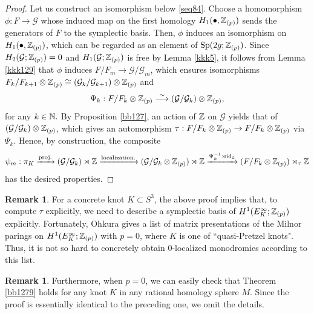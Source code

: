 \documentclass{article}
\theoremstyle{plain}
\theoremstyle{definition}
\newtheorem{rem}[thm]{Remark}
\newcommand{\lra}{\longrightarrow}
\newcommand{\ra}{\rightarrow}
\newcommand{\N}{{\Bbb N}}
\newcommand{\Q}{{\Bbb Q}}
\newcommand{\Z}{{\Bbb Z}}
\newcommand{\Sp}{{\rm Sp}}
\begin{document}
{\begin{proof}
Let us construct an isomorphism below \eqref{seq84}. Choose a homomorphism $\phi: F \ra \mathcal{G}$ whose induced map on the first homology $H_1(\bullet, \Z_{(p)})$ sends the generators of $F$ to the symplectic basis. Then, $\phi$ induces an isomorphism on $H_1(\bullet , \Z_{(p)})$, which can be regarded as an element of $\Sp(2g;\Z_{(p)})$. Since $H_2( \mathcal{G};\Z_{(p)})=0$ and $H_1( \mathcal{G};\Z_{(p)}) $ is free by Lemma \ref{kkk5}, it follows from Lemma \ref{kkk129} that $\phi$ induces $F/F_m \ra\mathcal{G}/\mathcal{G}_m$, which ensures isomorphisms $F_k/F_{k+1} \otimes \Z_{(p)} \cong (\mathcal{G}_k/\mathcal{G}_{k+1} )\otimes \Z_{(p)}$ and
\begin{equation}\label{seq84} \Psi_k: F/F_k \otimes \Z_{(p)} \stackrel{\sim}{\lra} (\mathcal{G}/\mathcal{G}_{k}) \otimes \Z_{(p)} , \end{equation}
for any $k\in \N.$ By Proposition \ref{bb127}, an action of $\Z$ on $ \mathcal{G} $ yields that of $ (\mathcal{G}/\mathcal{G}_{k}) \otimes \Z_{(p)} $, which gives an automorphism $\tau : F/F_k \otimes \Z_{(p)} \ra F/F_k \otimes \Z_{(p)}$ via $\Psi_k$. Hence, by construction, the composite
\[\psi_m: \pi_K \xrightarrow{ \rm proj. } (\mathcal{G}/\mathcal{G}_{k}) \rtimes \Z
\xrightarrow{ \rm localization. } (\mathcal{G}/\mathcal{G}_{k}\otimes \Z_{(p)} ) \rtimes \Z
\xrightarrow{ \Psi_k^{-1} \rtimes \mathrm{id}_{\Z} } (F/F_{k}\otimes \Z_{(p)} ) \rtimes_{\tau} \Z \]
has the desired properties. %
\end{proof}



\begin{rem}\label{okura}
For a concrete knot $K \subset S^3$, the above proof implies that, to compute $\tau$ explicitly, we need to describe a symplectic basis of $H^1(E_{K}^{\infty };\Z_{(p)}) $ explicitly. Fortunately, Ohkura \cite{Oh} gives a list of matrix presentations of the Milnor parings on $H^1(E_{K}^{\infty };\Z_{(p)}) $ with $p=0$, where $K$ is one of ``quasi-Pretzel knots". Thus, it is not so hard to concretely obtain $0$-localized monodromies according to this list.
\end{rem}
\begin{rem}\label{okura2}
Furthermore, when $p=0$, we can easily check that Theorem \ref{bb1279} holds for any knot $K$ in any rational homology sphere $M$. %
Since the proof is essentially identical to the preceding one,
we omit the details.
\end{rem}

}
\end{document}
